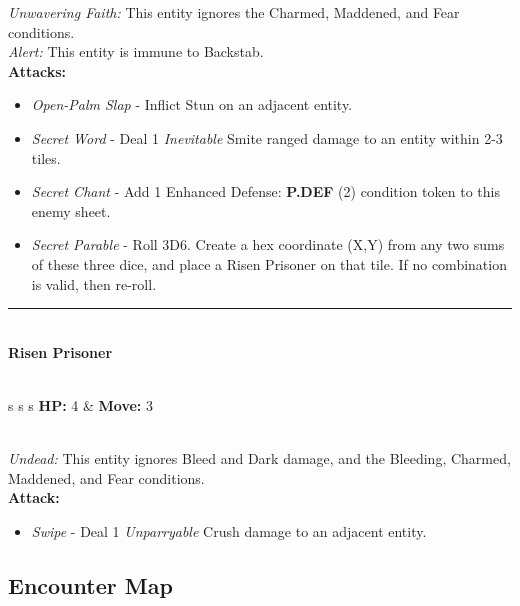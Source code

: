 \emph{Unwavering Faith:} This entity ignores the Charmed, Maddened, and Fear conditions.\\

\emph{Alert:} This entity is immune to Backstab.\\

\textbf{Attacks:}
\begin{itemize}
\item \emph{Open-Palm Slap} - Inflict Stun on an adjacent entity.
\item \emph{Secret Word} - Deal 1 \emph{Inevitable} Smite ranged damage to an entity within 2-3 tiles.
\item \emph{Secret Chant} - Add 1 Enhanced Defense: \textbf{P.DEF} (2) condition token to this enemy sheet.
\item \emph{Secret Parable} - Roll 3D6. Create a hex coordinate (X,Y) from any two sums of these three dice, and place a Risen Prisoner on that tile. If no combination is valid, then re-roll.
\end{itemize}
\hrule
\ \\
{\large \textbf{Risen Prisoner}}\\\\
\begin{tabular}{s s s}
\textbf{HP:} 4 & \textbf{Move:} 3\\
\end{tabular}\\

\emph{Undead:} This entity ignores Bleed and Dark damage, and the Bleeding, Charmed, Maddened, and Fear conditions.\\

\textbf{Attack:}
\begin{itemize}
\item \emph{Swipe} - Deal 1 \emph{Unparryable} Crush damage to an adjacent entity.
\end{itemize}

\pagebreak

\subsection*{Encounter Map}
\begin{center}
\end{center}

